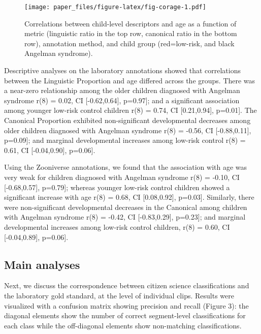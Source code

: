 \documentclass[english,,man,floatsintext]{apa6}
\begin{document}
\begin{figure}
\centering
\texttt{[image: paper\_files/figure-latex/fig-corage-1.pdf]}
\caption{\label{fig:fig-corage}Correlations between child-level descriptors and age as a function of metric (linguistic ratio in the top row, canonical ratio in the bottom row), annotation method, and child group (red=low-risk, and black Angelman syndrome).}
\end{figure}

Descriptive analyses on the laboratory annotations showed that correlations between the Linguistic Proportion and age differed across the groups. There was a near-zero relationship among the older children diagnosed with Angelman syndrome r(8) = 0.02, CI {[}-0.62,0.64{]}, p=0.97{]}; and a significant association among younger low-risk control children r(8) = 0.74, CI {[}0.21,0.94{]}, p=0.01{]}. The Canonical Proportion exhibited non-significant developmental decreases among older children diagnosed with Angelman syndrome r(8) = -0.56, CI {[}-0.88,0.11{]}, p=0.09{]}; and marginal developmental increases among low-risk control r(8) = 0.61, CI {[}-0.04,0.90{]}, p=0.06{]}.

Using the Zooniverse annotations, we found that the association with age was very weak for children diagnosed with Angelman syndrome r(8) = -0.10, CI {[}-0.68,0.57{]}, p=0.79{]}; whereas younger low-risk control children showed a significant increase with age r(8) = 0.68, CI {[}0.08,0.92{]}, p=0.03{]}. Similarly, there were non-significant developmental decreases in the Canonical among children with Angelman syndrome r(8) = -0.42, CI {[}-0.83,0.29{]}, p=0.23{]}; and marginal developmental increases among low-risk control children, r(8) = 0.60, CI {[}-0.04,0.89{]}, p=0.06{]}.

\hypertarget{main-analyses}{%
\subsection{Main analyses}\label{main-analyses}}

Next, we discuss the correspondence between citizen science classifications and the laboratory gold standard, at the level of individual clips. Results were visualized with a confusion matrix showing precision and recall (Figure 3): the diagonal elements show the number of correct segment-level classifications for each class while the off-diagonal elements show non-matching classifications.
\end{document}
